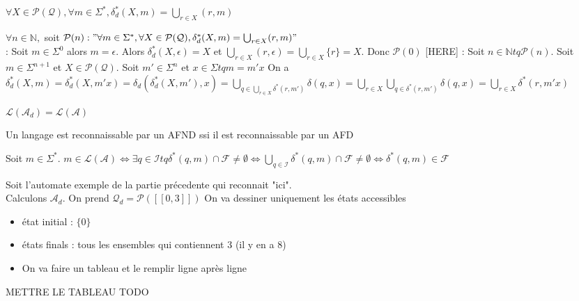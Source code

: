\begin{proposition}
    $\forall X\in \mathcal{P}(\mathcal{Q}), \forall m \in \Sigma^*, \delta_d^*(X,m)= \bigcup_{r\in X}(r,m)$
\end{proposition}

\begin{dem}
    $\forall n \in \mathbb{N},$ soit $\mathcal{P}(n):"\forall  m \in \Sigma^*, \forall X \in \mathcal{P}(\mathcal{Q}), \delta^*_d(X,m)=\bigcup_{r\in X}(r,m)"$\\
    [INIT] : Soit $m \in \Sigma^0$ alors $m=\epsilon$. Alors $\delta^*_d(X,\epsilon)=X$ et $\bigcup_{r\in X}(r,\epsilon)=\bigcup_{r\in X} \{r\}=X$. Donc $\mathcal{P}(0)$
    [HERE] : Soit $n\in \mathbb{N} tq \mathcal{P}(n)$. Soit $m \in \Sigma^{n+1}$ et $X \in \mathcal{P}(\mathcal{Q})$.
    Soit $m' \in \Sigma^{n}$ et $x \in \Sigma tq m = m'x$
    On a $\delta^*_d(X,m)=\delta^*_d(X,m'x) = \delta_d(\delta^*_d(X,m'),x)= \bigcup_{q\in \bigcup_{r\in X} \delta^*(r,m')}\delta(q,x)= \bigcup_{r\in X}\bigcup_{q\in \delta^*(r,m')} \delta(q,x)= \bigcup_{r\in X} \delta^*(r,m'x)$
\end{dem}

\begin{theorem}
    $\mathcal{L}(\mathcal{A}_d)=\mathcal{L}(\mathcal{A})$
\end{theorem}

\begin{corollary}
    Un langage est reconnaissable par un AFND ssi il est reconnaissable par un AFD
\end{corollary}

\begin{dem}
    Soit $m\in \Sigma^*$. $m\in\mathcal{L}(\mathcal{A})\Leftrightarrow \exists q \in \mathcal{I} tq \delta^*(q,m)\cap\mathcal{F}\not=\emptyset \Leftrightarrow \bigcup_{q\in \mathcal{I}}\delta^*(q,m)\cap\mathcal{F}\not=\emptyset \Leftrightarrow \delta^*(q,m)\in\mathcal{F}  $
\end{dem}

\begin{example}
    Soit l'automate exemple de la partie précedente qui reconnait "ici".\\
    Calculons $\mathcal{A}_d$. On prend $\mathcal{Q}_d=\mathcal{P}([[0,3]])$
    On va dessiner uniquement les états accessibles
    \begin{itemize}
        \item état initial : $\{0\}$
        \item états finals : tous les ensembles qui contiennent 3 (il y en a 8)
        \item On va faire un tableau et le remplir ligne après ligne
    \end{itemize}

METTRE LE TABLEAU TODO
\end{example}

